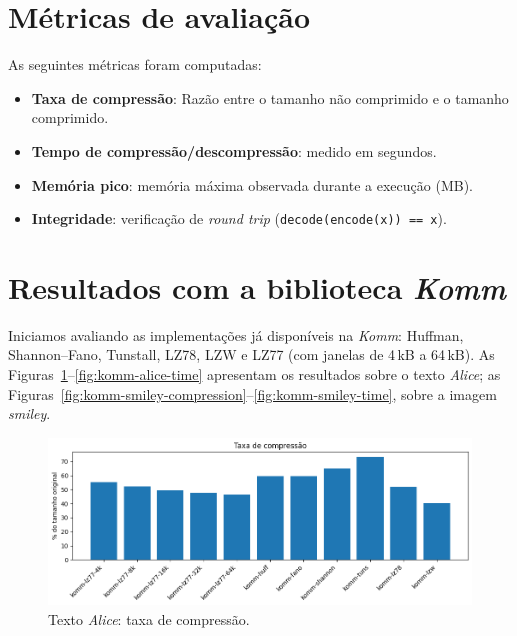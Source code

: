 \section{Métricas de avaliação}

As seguintes métricas foram computadas:

\begin{itemize}
  \item \textbf{Taxa de compressão}: Razão entre o tamanho não comprimido e o tamanho comprimido.
  \item \textbf{Tempo de compressão/descompressão}: medido em segundos.
  \item \textbf{Memória pico}: memória máxima observada durante a execução (MB).
  \item \textbf{Integridade}: verificação de \emph{round trip} (\texttt{decode(encode(x)) == x}).
\end{itemize}

\section{Resultados com a biblioteca \textit{Komm}}

Iniciamos avaliando as implementações já disponíveis na \textit{Komm}: Huffman, Shannon--Fano, Tunstall, LZ78, LZW e LZ77 (com janelas de 4\,kB a 64\,kB). As Figuras~\ref{fig:komm-alice-compression}–\ref{fig:komm-alice-time} apresentam os resultados sobre o texto \textit{Alice}; as Figuras~\ref{fig:komm-smiley-compression}–\ref{fig:komm-smiley-time}, sobre a imagem \textit{smiley}.

\begin{figure}[h]
  \centering
  \caption{Texto \textit{Alice}: taxa de compressão.}
  \label{fig:komm-alice-compression}
  \includegraphics[width=15cm]{figuras/komm_alice_compression.png}
\end{figure}

